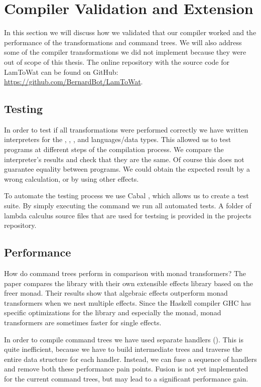 \chapter{\label{chap:compiler}Compiler Validation and Extension}
In this section we will discuss how we validated that our compiler worked and the performance of the transformations and command trees. We will also address some of the compiler transformations we did not implement because they were out of scope of this thesis. The online repository with the source code for LamToWat can be found on GitHub: \url{https://github.com/BernardBot/LamToWat}.

\section{Testing}
In order to test if all transformations were performed correctly we have written interpreters for the , , , and  languages/data types. This allowed us to test programs at different steps of the compilation process. We compare the interpreter's results and check that they are the same. Of course this does not guarantee equality between programs. We could obtain the expected result by a wrong calculation, or by using other effects.

To automate the testing process we use Cabal \autocite{haskellcabal}, which allows us to create a test suite. By simply executing the  command we run all automated tests. A folder of lambda calculus source files that are used for testsing is provided in the projects repository.

\section{Performance}
How do command trees perform in comparison with monad transformers? The paper  \autocite{DBLP:conf/haskell/KiselyovI15} compares the  library with their own extensible effects library based on the freer monad. Their results show that algebraic effects outperform monad transformers when we nest multiple effects. Since the Haskell compiler GHC has specific optimizations for the  library and especially the  monad, monad transformers are sometimes faster for single effects.

In order to compile command trees we have used separate handlers (). This is quite inefficient, because we have to build intermediate trees and traverse the entire data structure for each handler. Instead, we can fuse \autocite{DBLP:conf/mpc/WuS15} a sequence of handlers and remove both these performance pain points. Fusion is not yet implemented for the current command trees, but may lead to a significant performance gain.

